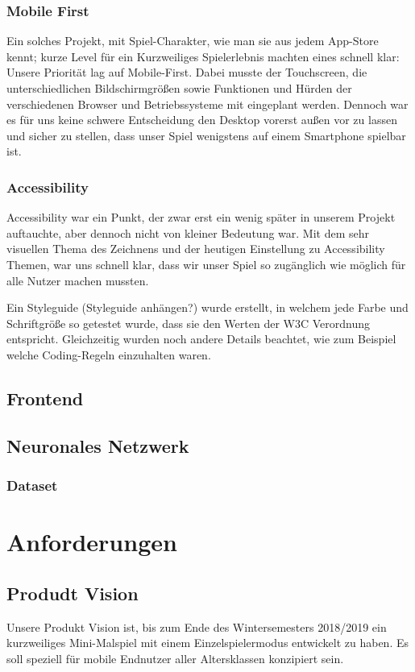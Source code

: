 \documentclass[11pt]{article}
\begin{document}
\subsubsection{Mobile First}

Ein solches Projekt, mit Spiel-Charakter, wie man sie aus jedem App-Store kennt; kurze Level für ein Kurzweiliges Spielerlebnis machten eines schnell klar: Unsere Priorität lag auf Mobile-First.
Dabei musste der Touchscreen, die unterschiedlichen Bildschirmgrößen sowie Funktionen und Hürden der verschiedenen Browser und Betriebssysteme mit eingeplant werden. Dennoch war es für uns keine schwere Entscheidung den Desktop vorerst außen vor zu lassen und sicher zu stellen, dass unser Spiel wenigstens auf einem Smartphone spielbar ist.

\subsubsection{Accessibility}

Accessibility war ein Punkt, der zwar erst ein wenig später in unserem Projekt auftauchte, aber dennoch nicht von kleiner Bedeutung war. Mit dem sehr visuellen Thema des Zeichnens und der heutigen Einstellung zu Accessibility Themen, war uns schnell klar, dass wir unser Spiel so zugänglich wie möglich für alle Nutzer machen mussten.

Ein Styleguide (Styleguide anhängen?) wurde erstellt, in welchem jede Farbe und Schriftgröße so getestet wurde, dass sie den Werten der W3C Verordnung entspricht.
Gleichzeitig wurden noch andere Details beachtet, wie zum Beispiel welche Coding-Regeln einzuhalten waren.


\subsection{Frontend}
\subsection{Neuronales Netzwerk}
\subsubsection{Dataset}
\section{Anforderungen}
\label{chap: Anforderungen}
\subsection{Produdt Vision}
\label{sec:productVision}
Unsere Produkt Vision ist, bis zum Ende des Wintersemesters 2018/2019 ein kurzweiliges Mini-Malspiel mit einem Einzelspielermodus entwickelt zu haben. Es soll speziell für mobile Endnutzer aller Altersklassen konzipiert sein.
\end{document}
